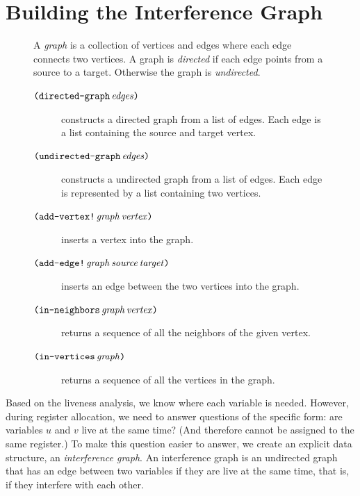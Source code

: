 \documentclass[11pt]{book}
\begin{document}
\section{Building the Interference Graph}
\label{sec:build-interference}

\begin{figure}
  \small
  \begin{tcolorbox}[title=\href{https://docs.racket-lang.org/graph/index.html}{The Racket Graph Library}]
    A \emph{graph} is a collection of vertices and edges where each
    edge connects two vertices.  A graph is \emph{directed} if each
    edge points from a source to a target.  Otherwise the graph is
    \emph{undirected}.
  \begin{description}
  \item[$\texttt{(}\texttt{directed-graph}\,\mathit{edges}\texttt{)}$] constructs a
    directed graph from a list of edges. Each edge is a list
    containing the source and target vertex.
  \item[$\texttt{(}\texttt{undirected-graph}\,\mathit{edges}\texttt{)}$] constructs a
    undirected graph from a list of edges. Each edge is represented by
    a list containing two vertices.
  \item[$\texttt{(}\texttt{add-vertex!}\,\mathit{graph}\,\mathit{vertex}\texttt{)}$]
    inserts a vertex into the graph.
  \item[$\texttt{(}\texttt{add-edge!}\,\mathit{graph}\,\mathit{source}\,\mathit{target}\texttt{)}$]
    inserts an edge between the two vertices into the graph.
  \item[$\texttt{(}\texttt{in-neighbors}\,\mathit{graph}\,\mathit{vertex}\texttt{)}$]
    returns a sequence of all the neighbors of the given vertex.
  \item[$\texttt{(}\texttt{in-vertices}\,\mathit{graph}\texttt{)}$]
    returns a sequence of all the vertices in the graph.
  \end{description}
\end{tcolorbox}
\end{figure}

Based on the liveness analysis, we know where each variable is needed.
However, during register allocation, we need to answer questions of
the specific form: are variables $u$ and $v$ live at the same time?
(And therefore cannot be assigned to the same register.)  To make this
question easier to answer, we create an explicit data structure, an
\emph{interference graph}.  An interference
graph is an undirected graph that has an edge between two variables if
they are live at the same time, that is, if they interfere with each
other.
\end{document}
